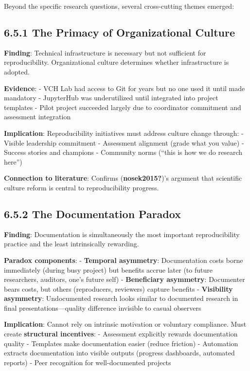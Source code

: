 \documentclass[
  oneside,
  open=any]{scrbook}
\begin{document}
Beyond the specific research questions, several cross-cutting themes
emerged:

\subsection{6.5.1 The Primacy of Organizational
Culture}\label{the-primacy-of-organizational-culture}

\textbf{Finding}: Technical infrastructure is necessary but not
sufficient for reproducibility. Organizational culture determines
whether infrastructure is adopted.

\textbf{Evidence}: - VCH Lab had access to Git for years but no one used
it until made mandatory - JupyterHub was underutilized until integrated
into project templates - Pilot project succeeded largely due to
coordinator commitment and assessment integration

\textbf{Implication}: Reproducibility initiatives must address culture
change through: - Visible leadership commitment - Assessment alignment
(grade what you value) - Success stories and champions - Community norms
(``this is how we do research here'')

\textbf{Connection to literature}: Confirms (\textbf{nosek2015?})'s
argument that scientific culture reform is central to reproducibility
progress.

\subsection{6.5.2 The Documentation
Paradox}\label{the-documentation-paradox}

\textbf{Finding}: Documentation is simultaneously the most important
reproducibility practice and the least intrinsically rewarding.

\textbf{Paradox components}: - \textbf{Temporal asymmetry}:
Documentation costs borne immediately (during busy project) but benefits
accrue later (to future researchers, auditors, one's future self) -
\textbf{Beneficiary asymmetry}: Documenter bears costs, but others
(reproducers, reviewers) capture benefits - \textbf{Visibility
asymmetry}: Undocumented research looks similar to documented research
in final presentations---quality difference invisible to casual
observers

\textbf{Implication}: Cannot rely on intrinsic motivation or voluntary
compliance. Must create \textbf{structural incentives}: - Assessment
explicitly rewards documentation quality - Templates make documentation
easier (reduce friction) - Automation extracts documentation into
visible outputs (progress dashboards, automated reports) - Peer
recognition for well-documented projects
\end{document}
